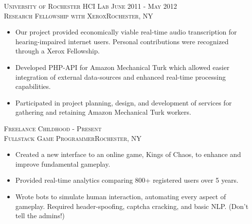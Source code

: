 \documentclass[oneside, final]{scrartcl}
\begin{document}
\begin{center}
\textsc{University of Rochester HCI Lab \hfill June 2011 - May 2012\\}
\textsc{Research Fellowship with Xerox\hfill Rochester, NY\\}
\begin{itemize}
  \vspace{-8pt}
  \setlength{\itemsep}{1pt}
  \setlength{\parskip}{0pt}
  \setlength{\parsep}{0pt}
  \setlength{\leftmargin}{-5mm}
  \item Our project provided economically viable real-time audio transcription for hearing-impaired internet users. Personal contributions were recognized through a Xerox Fellowship.
  \item Developed PHP-API for Amazon Mechanical Turk which allowed easier integration of external data-sources and enhanced real-time processing capabilities.
  \item Participated in project planning, design, and development of services for gathering and retaining Amazon Mechanical Turk workers.
\end{itemize}



\textsc{Freelance \hfill  Childhood - Present\\}
\textsc{Fullstack Game Programmer\hfill Rochester, NY\\}
\begin{itemize}
    \vspace{-8pt}
	\setlength{\itemsep}{1pt}
	\setlength{\parskip}{0pt}
	\setlength{\parsep}{0pt}
	\setlength{\leftmargin}{-5mm}
	\item Created a new interface to an online game, Kings of Chaos, to enhance and improve fundamental gameplay.
	\item Provided real-time analytics comparing 800+ registered users over 5 years.
	\item Wrote bots to simulate human interaction, automating every aspect of gameplay. Required header-spoofing, captcha cracking, and basic NLP. (Don't tell the admins!)
\end{itemize}

\clearpage


 \begin{comment}

\textsc{Intellisites \hfill Summer 2009, 2010\\}
\textsc{Web Developer\hfill Albany, NY\\}
\begin{itemize}
	\setlength{\itemsep}{1pt}
	\setlength{\parskip}{0pt}
	\setlength{\parsep}{0pt}
	\setlength{\leftmargin}{-5mm}
	\item Performed security audits on legacy websites for OWASP Top-10 vulnerabilities including SQL injection, Cross-site Scripting and configuration problems.
	\item Wrote file management application with granular user access control and permissions. Application allowed productivity increases in client office.
\end{itemize}


\end{comment}
\end{center}
\end{document}
